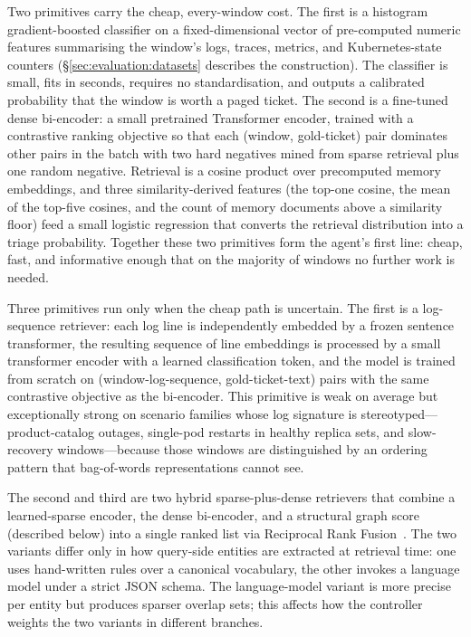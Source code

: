  Two primitives carry the cheap, every-window cost. The first is a histogram gradient-boosted classifier on a fixed-dimensional vector of pre-computed numeric features summarising the window's logs, traces, metrics, and Kubernetes-state counters (\S\ref{sec:evaluation:datasets} describes the construction). The classifier is small, fits in seconds, requires no standardisation, and outputs a calibrated probability that the window is worth a paged ticket. The second is a fine-tuned dense bi-encoder: a small pretrained Transformer encoder, trained with a contrastive ranking objective so that each (window, gold-ticket) pair dominates other pairs in the batch with two hard negatives mined from sparse retrieval plus one random negative. Retrieval is a cosine product over precomputed memory embeddings, and three similarity-derived features (the top-one cosine, the mean of the top-five cosines, and the count of memory documents above a similarity floor) feed a small logistic regression that converts the retrieval distribution into a triage probability. Together these two primitives form the agent's first line: cheap, fast, and informative enough that on the majority of windows no further work is needed.

 Three primitives run only when the cheap path is uncertain. The first is a log-sequence retriever: each log line is independently embedded by a frozen sentence transformer, the resulting sequence of line embeddings is processed by a small transformer encoder with a learned classification token, and the model is trained from scratch on (window-log-sequence, gold-ticket-text) pairs with the same contrastive objective as the bi-encoder. This primitive is weak on average but exceptionally strong on scenario families whose log signature is stereotyped---product-catalog outages, single-pod restarts in healthy replica sets, and slow-recovery windows---because those windows are distinguished by an ordering pattern that bag-of-words representations cannot see.

The second and third are two hybrid sparse-plus-dense retrievers that combine a learned-sparse encoder, the dense bi-encoder, and a structural graph score (described below) into a single ranked list via Reciprocal Rank Fusion~\cite{cormack2009rrf}. The two variants differ only in how query-side entities are extracted at retrieval time: one uses hand-written rules over a canonical vocabulary, the other invokes a language model under a strict JSON schema. The language-model variant is more precise per entity but produces sparser overlap sets; this affects how the controller weights the two variants in different branches.

